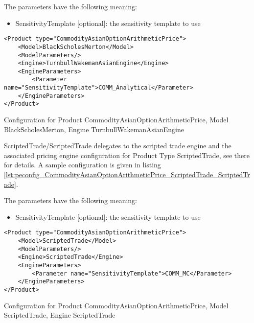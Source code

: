 The parameters have the following meaning:

\begin{itemize}
\item SensitivityTemplate [optional]: the sensitivity template to use 
\end{itemize}

\begin{longlisting}
\begin{verbatim}
<Product type="CommodityAsianOptionArithmeticPrice">
    <Model>BlackScholesMerton</Model>
    <ModelParameters/>
    <Engine>TurnbullWakemanAsianEngine</Engine>
    <EngineParameters>
        <Parameter name="SensitivityTemplate">COMM_Analytical</Parameter>
    </EngineParameters>
</Product>
\end{verbatim}
\caption{Configuration for Product CommodityAsianOptionArithmeticPrice, Model BlackScholesMerton, Engine TurnbullWakemanAsianEngine}
\label{lst:peconfig_CommodityAsianOptionArithmeticPrice_BlackScholesMerton_TurnbullWakemanAsianEngine}
\end{longlisting}

ScriptedTrade/ScriptedTrade delegates to the scripted trade engine and the associated pricing engine configuration for
Product Type ScriptedTrade, see there for details. A sample configuration is given in listing
\ref{lst:peconfig_CommodityAsianOptionArithmeticPrice_ScriptedTrade_ScriptedTrade}.

The parameters have the following meaning:

\begin{itemize}
\item SensitivityTemplate [optional]: the sensitivity template to use 
\end{itemize}

\begin{longlisting}
\begin{verbatim}
<Product type="CommodityAsianOptionArithmeticPrice">
    <Model>ScriptedTrade</Model>
    <ModelParameters/>
    <Engine>ScriptedTrade</Engine>
    <EngineParameters>
        <Parameter name="SensitivityTemplate">COMM_MC</Parameter>
    </EngineParameters>
</Product>
\end{verbatim}
\caption{Configuration for Product CommodityAsianOptionArithmeticPrice, Model ScriptedTrade, Engine ScriptedTrade}
\label{lst:peconfig_CommodityAsianOptionArithmeticPrice_ScriptedTrade_ScriptedTrade}
\end{longlisting}



